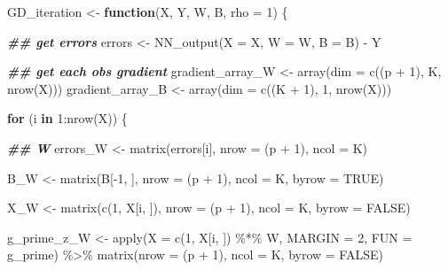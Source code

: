 \documentclass[
]{book}
\newenvironment{Shaded}{\begin{snugshade}}{\end{snugshade}}
\newcommand{\AttributeTok}[1]{\textcolor[rgb]{0.77,0.63,0.00}{#1}}
\newcommand{\ConstantTok}[1]{\textcolor[rgb]{0.00,0.00,0.00}{#1}}
\newcommand{\ControlFlowTok}[1]{\textcolor[rgb]{0.13,0.29,0.53}{\textbf{#1}}}
\newcommand{\DecValTok}[1]{\textcolor[rgb]{0.00,0.00,0.81}{#1}}
\newcommand{\DocumentationTok}[1]{\textcolor[rgb]{0.56,0.35,0.01}{\textbf{\textit{#1}}}}
\newcommand{\FunctionTok}[1]{\textcolor[rgb]{0.00,0.00,0.00}{#1}}
\newcommand{\NormalTok}[1]{#1}
\newcommand{\OtherTok}[1]{\textcolor[rgb]{0.56,0.35,0.01}{#1}}
\newcommand{\SpecialCharTok}[1]{\textcolor[rgb]{0.00,0.00,0.00}{#1}}
\begin{document}
\begin{Shaded}
\begin{Highlighting}[]
\NormalTok{GD\_iteration }\OtherTok{\textless{}{-}} \ControlFlowTok{function}\NormalTok{(X, Y, W, B, }\AttributeTok{rho =} \DecValTok{1}\NormalTok{) \{}
  
  \DocumentationTok{\#\# get errors}
\NormalTok{  errors }\OtherTok{\textless{}{-}} \FunctionTok{NN\_output}\NormalTok{(}\AttributeTok{X =}\NormalTok{ X, }\AttributeTok{W =}\NormalTok{ W, }\AttributeTok{B =}\NormalTok{ B) }\SpecialCharTok{{-}}\NormalTok{ Y}
  
  \DocumentationTok{\#\# get each obs\textquotesingle{} gradient}
\NormalTok{  gradient\_array\_W }\OtherTok{\textless{}{-}} \FunctionTok{array}\NormalTok{(}\AttributeTok{dim =} \FunctionTok{c}\NormalTok{((p }\SpecialCharTok{+} \DecValTok{1}\NormalTok{), K, }\FunctionTok{nrow}\NormalTok{(X)))}
\NormalTok{  gradient\_array\_B }\OtherTok{\textless{}{-}} \FunctionTok{array}\NormalTok{(}\AttributeTok{dim =} \FunctionTok{c}\NormalTok{((K }\SpecialCharTok{+} \DecValTok{1}\NormalTok{), }\DecValTok{1}\NormalTok{, }\FunctionTok{nrow}\NormalTok{(X)))}
  
  \ControlFlowTok{for}\NormalTok{ (i }\ControlFlowTok{in} \DecValTok{1}\SpecialCharTok{:}\FunctionTok{nrow}\NormalTok{(X)) \{}
    
    \DocumentationTok{\#\# W}
\NormalTok{    errors\_W }\OtherTok{\textless{}{-}}  \FunctionTok{matrix}\NormalTok{(errors[i],}
                        \AttributeTok{nrow =}\NormalTok{ (p }\SpecialCharTok{+} \DecValTok{1}\NormalTok{),}
                        \AttributeTok{ncol =}\NormalTok{ K)}
    
\NormalTok{    B\_W }\OtherTok{\textless{}{-}} \FunctionTok{matrix}\NormalTok{(B[}\SpecialCharTok{{-}}\DecValTok{1}\NormalTok{, ],}
                  \AttributeTok{nrow =}\NormalTok{ (p }\SpecialCharTok{+} \DecValTok{1}\NormalTok{),}
                  \AttributeTok{ncol =}\NormalTok{ K,}
                  \AttributeTok{byrow =} \ConstantTok{TRUE}\NormalTok{)}
      
\NormalTok{    X\_W }\OtherTok{\textless{}{-}} \FunctionTok{matrix}\NormalTok{(}\FunctionTok{c}\NormalTok{(}\DecValTok{1}\NormalTok{, X[i, ]),}
                  \AttributeTok{nrow =}\NormalTok{ (p }\SpecialCharTok{+} \DecValTok{1}\NormalTok{),}
                  \AttributeTok{ncol =}\NormalTok{ K,}
                  \AttributeTok{byrow =} \ConstantTok{FALSE}\NormalTok{)}
    
\NormalTok{    g\_prime\_z\_W }\OtherTok{\textless{}{-}} \FunctionTok{apply}\NormalTok{(}\AttributeTok{X =} \FunctionTok{c}\NormalTok{(}\DecValTok{1}\NormalTok{, X[i, ]) }\SpecialCharTok{\%*\%}\NormalTok{ W,}
                         \AttributeTok{MARGIN =} \DecValTok{2}\NormalTok{,}
                         \AttributeTok{FUN =}\NormalTok{ g\_prime) }\SpecialCharTok{\%\textgreater{}\%}
      \FunctionTok{matrix}\NormalTok{(}\AttributeTok{nrow =}\NormalTok{ (p }\SpecialCharTok{+} \DecValTok{1}\NormalTok{),}
             \AttributeTok{ncol =}\NormalTok{ K,}
             \AttributeTok{byrow =} \ConstantTok{FALSE}\NormalTok{)}
    

\end{Highlighting}
\end{Shaded}
\end{document}

